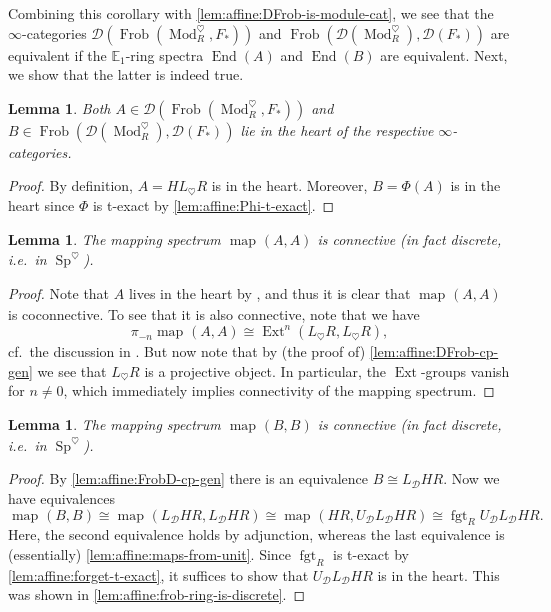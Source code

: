 \documentclass{article}
\theoremstyle{definition}
\theoremstyle{definition}
\theoremstyle{definition}
\theoremstyle{plain}
\newtheorem{lem}[defn]{Lemma}
\theoremstyle{plain}
\theoremstyle{plain}
\theoremstyle{plain}
\theoremstyle{plain}
\theoremstyle{plain}
\theoremstyle{plain}
\theoremstyle{plain}
\theoremstyle{remark}
\theoremstyle{remark}
\theoremstyle{plain}
\theoremstyle{plain}
\theoremstyle{plain}
\theoremstyle{plain}
\theoremstyle{plain}
\newcommand{\ModDisc}[1]{\operatorname{Mod}_{#1}^{\heartsuit}}
\newcommand{\Frob}[2]{\operatorname{Frob}(#1, #2)}
\newcommand{\End}[1]{\operatorname{End}(#1)}
\newcommand{\Sp}{\operatorname{Sp}}
\newcommand{\fgt}[1]{\operatorname{fgt}_{#1}}
\newcommand{\Cat}[1]{\mathcal{#1}}
\newcommand{\map}[3]{\operatorname{map}_{#1}({#2}, {#3})} %
\begin{document}
Combining this corollary with \cref{lem:affine:DFrob-is-module-cat}, 
we see that the $\infty$-categories $\Cat D(\Frob{\ModDisc{R}}{F_*})$ and $\Frob{\Cat D(\ModDisc{R})}{\Cat D(F_*)}$ 
are equivalent if the $\mathbb{E}_1$-ring spectra $\End{A}$ and $\End{B}$ are equivalent.
Next, we show that the latter is indeed true.

\begin{lem} \label{lem:affine:A-B-heart}
    Both $A \in \Cat{D}(\Frob{\ModDisc{R}}{F_*})$
    and $B \in \Frob{\Cat D(\ModDisc{R})}{\Cat D(F_*)}$ 
    lie in the heart of the respective $\infty$-categories.
\end{lem}
\begin{proof}
    By definition, $A = HL_{\heartsuit} R$ is in the heart.
    Moreover, $B = \Phi(A)$ is in the heart since $\Phi$ is t-exact by \cref{lem:affine:Phi-t-exact}.
\end{proof}

\begin{lem} \label{lem:affine:mapping-spectrum-A-discrete}
    The mapping spectrum $\map{}{A}{A}$ is connective (in fact discrete, i.e.\ in $\Sp^\heartsuit$).
\end{lem}
\begin{proof}
    Note that $A$ lives in the heart by , and thus it is clear that $\map{}{A}{A}$ is coconnective.
    To see that it is also connective, note that we have 
    \begin{equation*}
        \pi_{-n}\map{}{A}{A} \cong \operatorname{Ext}^n(L_{\heartsuit} R, L_{\heartsuit} R),
    \end{equation*}
    cf.\ the discussion in \cite[Notation 1.1.2.17]{higheralgebra}.
    But now note that by (the proof of) \cref{lem:affine:DFrob-cp-gen} 
    we see that $L_{\heartsuit} R$ is a projective object.
    In particular, the $\operatorname{Ext}$-groups vanish for $n \neq 0$,
    which immediately implies connectivity of the mapping spectrum.
\end{proof}

\begin{lem} \label{lem:affine:mapping-spectrum-B-discrete}
    The mapping spectrum $\map{}{B}{B}$ is connective (in fact discrete, i.e.\ in $\Sp^\heartsuit$).
\end{lem}
\begin{proof}
    By \cref{lem:affine:FrobD-cp-gen} there is an equivalence $B \cong L_{\Cat D} HR$.
    Now we have equivalences 
    \begin{equation*}
        \map{}{B}{B} \cong \map{}{L_{\Cat D} HR}{L_{\Cat D} HR} \cong \map{}{HR}{U_{\Cat D} L_{\Cat D} HR} \cong \fgt{R} U_{\Cat D} L_{\Cat D} HR.
    \end{equation*}
    Here, the second equivalence holds by adjunction, whereas the last equivalence is (essentially) \cref{lem:affine:maps-from-unit}.
    Since $\fgt{R}$ is t-exact by \cref{lem:affine:forget-t-exact}, it suffices to show that $U_{\Cat D} L_{\Cat D} HR$ 
    is in the heart. This was shown in \cref{lem:affine:frob-ring-is-discrete}.
\end{proof}
\end{document}

